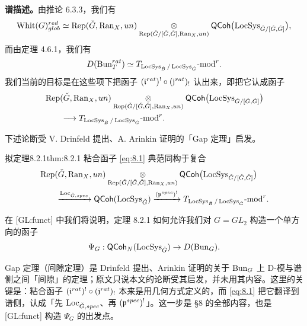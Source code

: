 \textbf{谱描述。}由推论 6.3.3，我们有
\[
  \mathrm{Whit}(G)^{red}_{glob}\simeq
  \operatorname{Rep}(\check G,\mathrm{Ran}_X,un)
  \underset{\operatorname{Rep}(\check G/[\check G,\check G],\mathrm{Ran}_X,un)}{\otimes}
  \mathsf{QCoh}\bigl(\operatorname{LocSys}_{\check G/[\check G,\check G]}\bigr),
\]
而由定理 4.6.1，我们有
\[
  D(\operatorname{Bun}^{rat}_T)\simeq T_{\operatorname{LocSys}_{\check B}/\operatorname{LocSys}_{\check G}}\text{-}\mathrm{mod}^r .
\]
我们当前的目标是在这些项下把函子 $(\mathfrak{i}^{rat})^!\circ(\mathfrak{j}^{rat})_!$ 认出来，即把它认成函子
\begin{equation}
\begin{aligned}
&\operatorname{Rep}(\check G,\mathrm{Ran}_X,un)
  \underset{\operatorname{Rep}(\check G/[\check G,\check G],\mathrm{Ran}_X,un)}{\otimes}
  \mathsf{QCoh}\bigl(\operatorname{LocSys}_{\check G/[\check G,\check G]}\bigr)\\
&\qquad\longrightarrow
  T_{\operatorname{LocSys}_{\check B}/\operatorname{LocSys}_{\check G}}\text{-}\mathrm{mod}^r .
\end{aligned}
\label{eq:8.1}
\end{equation}

下述论断受 V. Drinfeld 提出、A. Arinkin 证明的「Gap 定理」启发。

\begin{othm}{拟定理}{8.2.1}{thm:8.2.1}
粘合函子 \eqref{eq:8.1} 典范同构于复合
\[
\begin{aligned}
&\operatorname{Rep}(\check G,\mathrm{Ran}_X,un)
  \underset{\operatorname{Rep}(\check G/[\check G,\check G],\mathrm{Ran}_X,un)}{\otimes}
  \mathsf{QCoh}\bigl(\operatorname{LocSys}_{\check G/[\check G,\check G]}\bigr)\\
&\qquad\xrightarrow{\operatorname{Loc}_{\check G,spec}}
  \mathsf{QCoh}(\operatorname{LocSys}_{\check G})
  \xrightarrow{(\mathfrak{p}^{spec})^!}
  T_{\operatorname{LocSys}_{\check B}/\operatorname{LocSys}_{\check G}}\text{-}\mathrm{mod}^r .
\end{aligned}
\]
\end{othm}

在 [GL:funct] 中我们将说明，定理 8.2.1 如何允许我们对 $G=GL_2$ 构造一个单方向的函子
\[
  \Psi_G : \mathsf{QCoh}_N(\operatorname{LocSys}_{\check G})\to D(\operatorname{Bun}_G).
\]

\begin{annote}
Gap 定理（间隙定理）是 Drinfeld 提出、Arinkin 证明的关于 $\operatorname{Bun}_G$ 上 D-模与谱侧之间「间隙」的定理；原文只说本文的论断受其启发，并未用其内容。这里的关键是：粘合函子 $(\mathfrak{i}^{rat})^!\circ(\mathfrak{j}^{rat})_!$ 本来是用几何方式定义的，而 \eqref{eq:8.1} 把它翻译到谱侧，认成「先 $\operatorname{Loc}_{\check G,spec}$、再 $(\mathfrak{p}^{spec})^!$」。这一步是 §8 的全部内容，也是 [GL:funct] 构造 $\Psi_G$ 的出发点。\par\vspace{0.15em}{\raggedleft 【来源：原书 p.17 §8.2（A）；译者按（把该论断在全文中的位置说清）】\par}
\end{annote}
